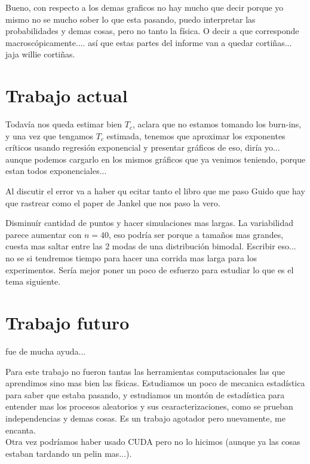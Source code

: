 \documentclass[a4paper,12pt]{article}
\begin{document}
Bueno, con respecto a los demas graficos no hay mucho que decir porque yo mismo no se mucho sober lo que esta pasando, puedo interpretar las probabilidades y demas cosas, pero no tanto la física. O decir a que corresponde macroscópicamente.... así que estas partes del informe van a quedar cortiñas... jaja willie cortiñas.

\section{Trabajo actual}

Todavía nos queda estimar bien $T_c$, aclara que no estamos tomando los burn-ins, y una vez que tengamos $T_c$ estimada, tenemos que aproximar los exponentes críticos usando regresión exponencial y presentar gráficos de eso, diría yo... aunque podemos cargarlo en los mismos gráficos que ya venimos teniendo, porque estan todos exponenciales...

Al discutir el error va a haber qu ecitar tanto el libro que me paso Guido que hay que rastrear como el paper de Jankel que nos paso la vero.

Disminuír cantidad de puntos y hacer simulaciones mas largas. La variabilidad parece aumentar con $n = 40$, eso podría ser porque a tamaños mas grandes, cuesta mas saltar entre las 2 modas de una distribución bimodal. Escribir eso... no se si tendremos tiempo para hacer una corrida mas larga para los experimentos. Sería mejor poner un poco de esfuerzo para estudiar lo que es el tema siguiente.


\section{Trabajo futuro}

\cite{phillies2000elementary} fue de mucha ayuda...


Para este trabajo no fueron tantas las herramientas computacionales las que aprendimos sino mas bien las físicas. Estudiamos un poco de mecanica estadística para saber que estaba pasando, y estudiamos un montón de estadística para entender mas los procesos aleatorios y sus cearacterizaciones, como se prueban independencias y demas cosas. Es un trabajo agotador pero nuevamente, me encanta.\\

Otra vez podríamos haber usado CUDA pero no lo hicimos (aunque ya las cosas estaban tardando un pelin mas...).
\end{document}
